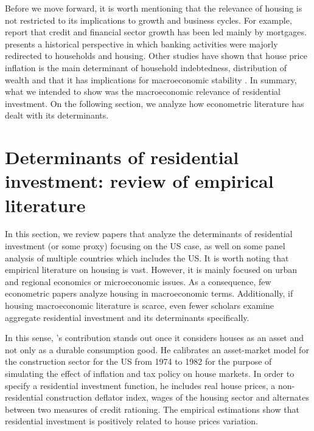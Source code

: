 \documentclass[12pt, a4paper]{article}
\begin{document}
Before we move forward, it is worth mentioning that the relevance of housing is not restricted to its implications to growth and business cycles.
For example, \textcite{jorda_great_2016} report that credit and financial sector growth has been led mainly by mortgages. 
\textcite{kohl_more_2018} presents a historical perspective in which banking activities were majorly redirected to households and housing.
Other studies have shown that house price inflation is the main determinant of household indebtedness, distribution of wealth and that it has implications for macroeconomic stability \cites{ryoo_household_2015}{stockhammer_debt-driven_2016}{barnes_private_2016}{johnston_global_2017}{mian_household_2017}{anderson_politics_2020}{fuller_housing_2020}.
In summary, what we intended to show was the macroeconomic relevance of residential investment.
On the following section, we analyze how econometric literature has dealt with its determinants.
\section{Determinants of residential investment: review of empirical literature}
\label{sec:orgb6c27da}
\label{sec:empirical_review}
In this section, we review papers that analyze the determinants of residential investment (or some proxy) focusing on the US case, as well on some panel analysis of multiple countries which includes the US.
It is worth noting that empirical literature on housing is vast.
However, it is mainly focused on urban and regional economics or microeconomic issues.
As a consequence, few econometric papers analyze housing in macroeconomic terms.
Additionally, if housing macroeconomic literature is scarce, even fewer scholars examine aggregate residential investment and its determinants specifically.

In this sense, \citeauthor*{poterba_tax_1984}'s \citeyear{poterba_tax_1984} contribution stands out once it considers houses as an asset and not only as a durable consumption good.
He calibrates an asset-market model for the construction sector for the US from 1974 to 1982 for the purpose of simulating the effect of inflation and tax policy on house markets.
In order to specify a residential investment function, he includes real house prices, a non-residential construction deflator index, wages of the housing sector and alternates between two measures  of  credit  rationing.
The empirical estimations show that residential investment is positively related to house prices variation.
\end{document}
